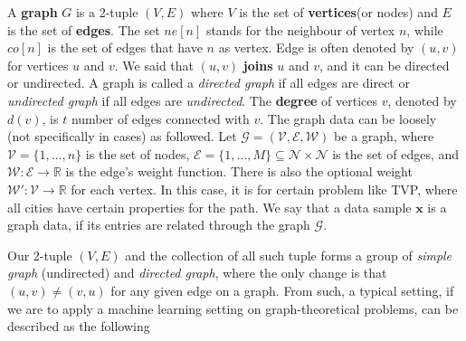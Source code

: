 \documentclass[10pt,oneside,oldfontcommands,dvipsnames,article]{memoir}
\begin{document}
A \textbf{graph} $G$ is a 2-tuple $(V,E)$ where $V$ is the set of \textbf{vertices}(or nodes) and $E$ is the set of \textbf{edges}. The set $ne[n]$ stands for the neighbour of vertex $n$, while $co[n]$ is the set of edges that have $n$ as vertex. Edge is often denoted by $(u,v)$ for vertices $u$ and $v$. We said that $(u,v)$ \textbf{joins} $u$ and $v$, and it can be directed or undirected. A graph is called a \textit{directed graph} if all edges are direct or \textit{undirected graph} if all edges are \textit{undirected}. The \textbf{degree} of vertices $v$, denoted by $d(v)$, is $t$ number of edges connected with $v$.
The graph data can be loosely (not specifically in cases) as followed. Let $\mathcal{G}=(\mathcal{V},\mathcal{E},\mathcal{W})$ be a graph, where $\mathcal{V}=\{1,\dots,n\}$ is the set of nodes, $\mathcal{E}=\{1,\dots,M\}\subseteq \mathcal{N}\times \mathcal{N}$ is the set of edges, and $\mathcal{W}: \mathcal{E}\to \mathbb{R}$ is the edge's weight function. There is also the optional weight $\mathcal{W}': \mathcal{V}\to \mathbb{R}$ for each vertex. In this case, it is for certain problem like TVP, where all cities have certain properties for the path. We say that a data sample $\mathbf{x}$ is a graph data, if its entries are related through the graph $\mathcal{G}$. 

Our 2-tuple $(V,E)$ and the collection of all such tuple forms a group of \textit{simple graph} (undirected) and \textit{directed graph}, where the only change is that $(u,v)\neq (v,u)$ for any given edge on a graph. From such, a typical setting, if we are to apply a machine learning setting on graph-theoretical problems, can be described as the following

\end{document}
